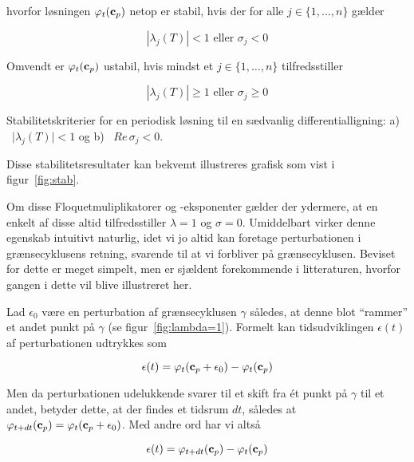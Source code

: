 hvorfor l{\o}sningen $\varphi_t({\bf c}_p)$ netop er
stabil, hvis der for alle $j\in\{1,\ldots,n\}$ g{\ae}lder

\begin{equation}
 \left| \lambda_j(T) \right| < 1 \mbox{\ \ eller \ \ }
 \sigma_j < 0
\end{equation}

Omvendt er $\varphi_t({\bf c}_p)$ ustabil, hvis mindst et
$j\in\{1,\ldots,n\}$ tilfredsstiller

\begin{equation}
 \left| \lambda_j(T) \right| \geq 1 \mbox{\ \ eller \ \ }
 \sigma_j \geq 0
\end{equation}

{
 
}
{
\caption{\protect\capsize
	 Stabilitetskriterier for en periodisk l{\o}sning til
	 en s{\ae}dvanlig differentiallig\-ning:
	 a) \ $\mid \lambda_j(T) \mid < 1$ og
	 b) \ $Re\, \sigma_j < 0$.}
\label{fig:stab}
}

Disse stabilitetsresultater kan bekvemt illustreres
grafisk som vist i figur~\ref{fig:stab}. 

\vspace{4.0mm}
Om disse Floquetmuliplikatorer og -eksponenter g{\ae}lder
der ydermere, at en enkelt af disse altid tilfredsstiller
$\lambda=1$ og $\sigma=0$. Umiddelbart virker denne
egenskab intuitivt naturlig, idet vi jo altid kan foretage
perturbationen i gr{\ae}nsecyklusens retning, svarende til
at vi forbliver p{\aa} gr{\ae}nsecyklusen. Beviset for
dette er meget simpelt, men er sj{\ae}ldent forekommende i
litteraturen, hvorfor gangen i dette vil blive illustreret
her.

\vspace{4.0mm}
Lad $\epsilon_0$ v{\ae}re en perturbation af
gr{\ae}nsecyklusen $\gamma$ s{\aa}ledes, at denne blot
``rammer'' et andet punkt p{\aa} $\gamma$ (se
figur~\ref{fig:lambda=1}). Formelt kan tidsudviklingen
$\epsilon (t)$ af perturbationen udtrykkes som

\begin{equation}
\epsilon (t) = \varphi_t({\bf c}_p+\epsilon_0) - \varphi_t({\bf c}_p)
\end{equation}

Men da perturbationen udelukkende svarer til et skift fra
\'{e}t punkt p{\aa} $\gamma$ til et andet, betyder dette,
at der findes et tidsrum $dt$, s{\aa}ledes at
$\varphi_{t+dt}({\bf c}_p) = \varphi_t({\bf
c}_p+\epsilon_0)$. Med andre ord har vi alts{\aa}

\begin{equation}
 \epsilon (t) = \varphi_{t+dt}({\bf c}_p) - \varphi_t({\bf c}_p)
\end{equation}

